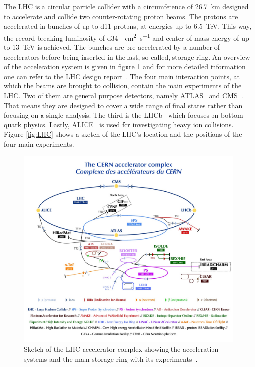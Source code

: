 The LHC is a circular particle collider with a circumference of \SI{26.7}{\kilo \metre} designed to  accelerate and collide two counter-rotating proton beams. The protons are accelerated in bunches of up to \num{d11} protons, at energies up to \SI{6.5}{\tera \electronvolt}. This way, the record breaking luminosity of \SI{d34}{\per\square\cm \per\s} and center-of-mass energy of up to \SI{13}{\tera \electronvolt} is achieved. The bunches are pre-accelerated by a number of accelerators before being inserted in the last, so called, storage ring. An overview of the acceleration system is given in figure \ref{fig:accelerator_complex} and for more detailed information one can refer to the LHC design report~\cite{lhc_machine}. 
The four main interaction points, at which the beams are brought to collision, contain the main experiments of the LHC. Two of them are general purpose detectors, namely ATLAS~\cite{atlas} and CMS~\cite{cms}. That means they are designed to cover a wide range of final states rather than focusing on a single analysis. The third is the LHCb~\cite{lhcb} which focuses on bottom-quark physics. Lastly, ALICE~\cite{alice} is used for investigating heavy ion collisions. Figure \ref{fig:LHC} shows a sketch of the LHC's location and the positions of the four main experiments.

\begin{figure}[htbp]
\centering
\includegraphics[width=\figwidth]{figures_LHC/CCC-v2018-print-v2.jpg}
\caption[Sketch of the LHC accelerator complex]{Sketch of the LHC accelerator complex showing the acceleration systems and the main storage ring with its experiments~\cite{Mobs:2636343}.}
\label{fig:accelerator_complex}
\end{figure}

